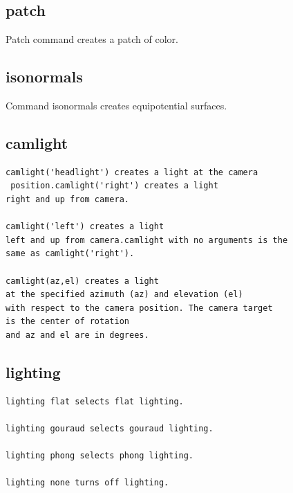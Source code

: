 \documentclass{ximera}
\begin{document}
\subsection{patch}

Patch command creates a patch of color.


\subsection{isonormals}

Command isonormals creates  equipotential surfaces. 
\subsection{camlight}

\begin{verbatim}
camlight('headlight') creates a light at the camera
 position.camlight('right') creates a light
right and up from camera.

camlight('left') creates a light
left and up from camera.camlight with no arguments is the
same as camlight('right').

camlight(az,el) creates a light
at the specified azimuth (az) and elevation (el)
with respect to the camera position. The camera target 
is the center of rotation
and az and el are in degrees.

\end{verbatim}



\subsection{lighting}


\begin{verbatim}
lighting flat selects flat lighting.

lighting gouraud selects gouraud lighting.

lighting phong selects phong lighting.

lighting none turns off lighting.
\end{verbatim}
\end{document}
